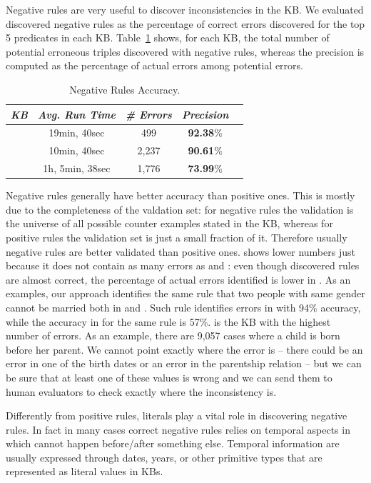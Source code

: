  Negative rules are very useful to discover inconsistencies in the KB. We evaluated discovered negative rules as the percentage of correct errors discovered for the top 5 predicates in each KB. Table~\ref{tab:neg_rules_acc} shows, for each KB, the total number of potential erroneous triples discovered with negative rules, whereas the precision is computed as the percentage of actual errors among potential errors.

\begin{table}[htb]
	\centering
	\caption{Negative Rules Accuracy.}
	\label{tab:neg_rules_acc}
	\begin{tabular}{|c|c|c|c|c|}
		\hline
		\hline
		{\it KB}&{\it Avg. Run Time}&{\it \# Errors} & {\it Precision} \tabularnewline
		\hline
		\dbpedia & 19min, 40sec& 499 & \textbf{92.38}\%\tabularnewline
		\yago & 10min, 40sec & 2,237& \textbf{90.61}\%\tabularnewline
		\wikidata & 1h, 5min, 38sec & 1,776 & \textbf{73.99}\%\tabularnewline
		\hline
	\end{tabular}
\end{table}

Negative rules generally have better accuracy than positive ones. This is mostly due to the completeness of the valdation set: for negative rules the validation is the universe of all possible counter examples stated in the KB, whereas for positive rules the validation set is just a small fraction of it. Therefore usually negative rules are better validated than positive ones. \wikidata shows lower numbers just because it does not contain as many errors as \dbpedia and \yago: even though discovered rules are almost correct, the percentage of actual errors identified is lower in \wikidata. As an examples, our approach identifies the same rule that two people with same gender cannot be married both in \yago and \wikidata. Such rule identifies errors in \yago with 94\% accuracy, while the accuracy in \wikidata for the same rule is 57\%. \yago is the KB with the highest number of errors. As an example, there are 9,057 cases where a child is born before her parent. We cannot point exactly where the error is -- there could be an error in one of the birth dates or an error in the parentship relation -- but we can be sure that at least one of these values is wrong and we can send them to human evaluators to check exactly where the inconsistency is.

Differently from positive rules, literals play a vital role in discovering negative rules. In fact in many cases correct negative rules relies on temporal aspects in which cannot happen before/after something else. Temporal information are usually expressed through dates, years, or other primitive types that are represented as literal values in KBs.

